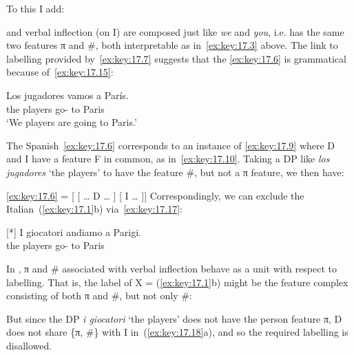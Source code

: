 \documentclass[output=paper]{langsci/langscibook}
\begin{document}
To this I add:

\ea\label{ex:key:17.14}
    \Fpl{} and \Spl{} verbal inflection (on I) are composed just like \emph{we}
    and \emph{you}, i.e. has the same two features π and \#, both interpretable
    as in~\eqref{ex:key:17.3} above.
\z
The link to labelling provided by~\eqref{ex:key:17.7} suggests that the 
\eqref{ex:key:17.6} is grammatical because of~\eqref{ex:key:17.15}:

\begin{exe}
\exi{\eqref{ex:key:17.6}}
    \gll    Los jugadores vamos a París.\\
            the players      go-\Fpl{} to Paris\\
    \glt    ‘We players are going to Paris.’\\
\end{exe}

\ea\label{ex:key:17.15}
    The Spanish~\eqref{ex:key:17.6} corresponds to an instance of \eqref{ex:key:17.9}
    where D and I have a feature F in common, as in~\eqref{ex:key:17.10}.
\z
Taking a DP like \emph{los jugadores} ‘the players’ to have the feature \#, but
not a π feature, we then have:

\ea\label{ex:key:17.16}
    \ref{ex:key:17.6} = [ [ \dots{} D\tss{\#} \dots{} ] [ I\tss{\#} \dots{} ]]
\z
Correspondingly, we can exclude the Italian~(\ref{ex:key:17.1}b)
via~\eqref{ex:key:17.17}:

\begin{exe}
    \exi{\eqref{ex:key:17.1}}
    \begin{xlist}
    [*]{%
    \gll I giocatori andiamo a Parigi.\\
    the players go-\Fpl{} to Paris\\
    \glt}
    \end{xlist}
\end{exe}
\ea\label{ex:key:17.17}
    In , π and \# associated with verbal inflection behave as a unit
    with respect to labelling.
\z
That is, the label of X = (\ref{ex:key:17.1}b) might be the feature complex
consisting of both π and \#, but not only \#:

\ea\label{ex:key:17.18}
    \z
\z
But since the DP \emph{i giocatori} ‘the players’ does not have the person
feature π, D does not share \{π, \#\} with I in~(\ref{ex:key:17.18}a), and so the
required labelling is disallowed.
\end{document}
